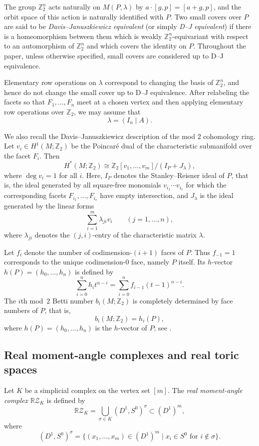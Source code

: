 \documentclass{amsart}
\numberwithin{equation}{section}
\theoremstyle{definition}
\theoremstyle{remark}
\newcommand{\Z}{\mathbb Z}
\newcommand{\RZ}{\mathbb R\mathcal Z}
\begin{document}
The group $\Z_2^n$ acts naturally on $M(P,\lambda)$ by $a\cdot [g,p]=[a+g,p]$, and the orbit space of this action is naturally identified with $P$.
Two small covers over $P$ are said to be \emph{Davis--Januszkiewicz equivalent} (or simply \emph{D--J equivalent}) if there is a homeomorphism between them
which is weakly $\Z_2^n$-equivariant with respect to an automorphism of $\Z_2^n$ and which covers the identity on $P$.
Throughout the paper, unless otherwise specified, small covers are considered up to D--J equivalence.

Elementary row operations on $\lambda$ correspond to changing the basis of $\Z_2^n$, and hence do not change the small cover up to D--J equivalence.
After relabeling the facets so that $F_1,\dots,F_n$ meet at a chosen vertex and then applying elementary row operations over $\Z_2$, we may assume that
$$
    \lambda=(I_n\mid A).
$$

We also recall the Davis--Januszkiewicz description of the mod $2$ cohomology ring.
Let $v_i\in H^1(M;\Z_2)$ be the Poincar\'e dual of the characteristic submanifold over the facet $F_i$.
Then
\begin{equation} \label{eq:mod2cohom_smallcover}
    H^\ast(M;\Z_2)\cong \Z_2[v_1,\dots,v_m]/(I_P+J_\lambda),  
\end{equation}
where $\deg v_i=1$ for all $i$.
Here, $I_P$ denotes the Stanley--Reisner ideal of $P$, that is, the ideal generated by all square-free monomials $v_{i_1}\cdots v_{i_r}$ for which the corresponding facets $F_{i_1},\dots,F_{i_r}$ have empty intersection, and $J_\lambda$ is the ideal generated by the linear forms
$$
    \sum_{i=1}^m \lambda_{ji}v_i \qquad (j=1,\dots,n),
$$
where $\lambda_{ji}$ denotes the $(j,i)$-entry of the characteristic matrix $\lambda$.

Let $f_i$ denote the number of codimension-$(i+1)$ faces of $P$.
Thus $f_{-1}=1$ corresponds to the unique codimension-$0$ face, namely $P$ itself.
Its $h$-vector $h(P)=(h_0,\ldots,h_n)$ is defined by
$$
    \sum_{i=0}^n h_i t^{n-i} = \sum_{i=0}^n f_{i-1}(t-1)^{n-i}.
$$
The $i$th mod~$2$ Betti number $b_i(M;\Z_2)$ is completely determined by face numbers of $P$, that is, 
\begin{equation} \label{eq:mod2betti}
    b_i(M;\Z_2)=h_i(P),  
\end{equation}
where $h(P)=(h_0,\dots,h_n)$ is the $h$-vector of $P$; see \cite{Davis-Januszkiewicz1991}.


\subsection{Real moment-angle complexes and real toric spaces} \label{subsection:RZK}
Let $K$ be a simplicial complex on the vertex set $[m]$.
The \emph{real moment-angle complex} $\RZ_K$ is defined by
$$
    \RZ_K = \bigcup_{\sigma\in K}(D^1,S^0)^\sigma \subset (D^1)^m,
$$
where
$$
    (D^1,S^0)^\sigma = \{(x_1,\dots,x_m)\in (D^1)^m \mid x_i\in S^0 \text{ for } i\notin \sigma\}.
$$
\end{document}
